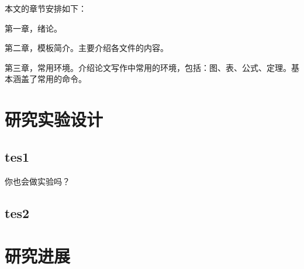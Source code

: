 本文的章节安排如下：

第一章，绪论。

第二章，模板简介。主要介绍各文件的内容。

第三章，常用环境。介绍论文写作中常用的环境，包括：图、表、公式、定理。基本涵盖了常用的命令。
\section{研究实验设计}
\subsection{tes1}
你也会做实验吗？
\subsection{tes2}
\section{研究进展}


